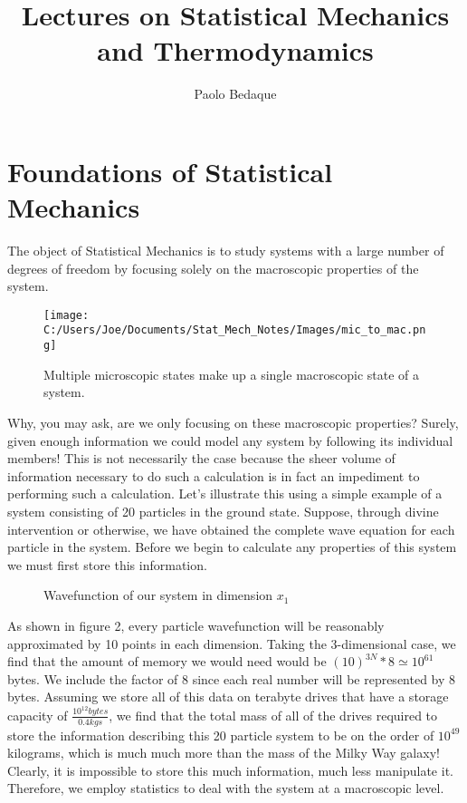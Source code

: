 \documentclass{book}
\title{Lectures on Statistical Mechanics and Thermodynamics}
\author{Paolo Bedaque}
\makeatletter
\def\lecture{\@ifnextchar[{\@lectureWith}{\@lectureWithout}}
\def\@lectureWith[#1]{\medbreak\refstepcounter{section}%
  \renewcommand{\leftmark}{Lecture \thesection}
  \noindent{\addcontentsline{toc}{section}{Lecture \thesection: #1\@addpunct{.}}%
  \sectionfont Lecture \thesection. #1\@addpunct{.}}\medbreak}
\def\@lectureWithout{\medbreak\refstepcounter{section}%
  \renewcommand{\leftmark}{Lecture \thesection}
  \noindent{\addcontentsline{toc}{section}{Lecture \thesection.}%
  \sectionfont Lecture \thesection.}\medbreak}
\makeatother
\begin{document}
\maketitle

\chapter{Foundations of Statistical Mechanics}

The object of Statistical Mechanics is to study systems with a large number of degrees of freedom by focusing solely on the macroscopic properties of the system.  

\begin{figure}
	\texttt{[image: C:/Users/Joe/Documents/Stat\_Mech\_Notes/Images/mic\_to\_mac.png]}
	\caption{Multiple microscopic states make up a single macroscopic state of a system.}
\end{figure}

Why, you may ask, are we only focusing on these macroscopic properties?  Surely, given enough information we could model any system by following its individual members!  This is not necessarily the case because the sheer volume of information necessary to do such a calculation is in fact an impediment to performing such a calculation.  Let's illustrate this using a simple example of a system consisting of 20 particles in the ground state.  Suppose, through divine intervention or otherwise, we have obtained the complete wave equation for each particle in the system.  Before we begin to calculate any properties of this system we must first store this information.  

\begin{figure}
\centering
	\begin{minipage}{0,49\textwidth}
		\caption{Wavefunction of our system in dimension $x_{1}$}
	\end{minipage}
\label{fig:information_graph}
\end{figure}

As shown in figure 2, every particle wavefunction will be reasonably approximated by 10 points in each dimension.  Taking the 3-dimensional case, we find that the amount of memory we would need would be $(10)^{3N}*8\simeq10^{61}$ bytes.  We include the factor of 8 since each real number will be represented by 8 bytes.  Assuming we store all of this data on terabyte drives that have a storage capacity of $\frac{10^{12} bytes}{0.4 kgs}$, we find that the total mass of all of the drives required to store the information describing this 20 particle system to be on the order of $10^{49}$ kilograms, which is much much more than the mass of the Milky Way galaxy!  Clearly, it is impossible to store this much information, much less manipulate it.  Therefore, we employ statistics to deal with the system at a macroscopic level. 
\end{document}
